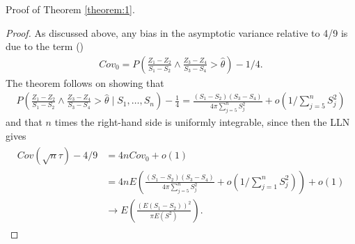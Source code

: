 \documentclass[12pt]{article}
\newcommand{\E}{E}
\renewcommand{\P}{P}
\newcommand{\cov}{Cov}
\newcommand{\z}{Z}
\newcommand{\s}{S}
\newcommand{\thetahat}{\hat{\theta}}
\begin{document}
\begin{appendices}
  \label{appendix:proof}

Proof of Theorem \ref{theorem:1}.

\begin{proof}
   As discussed above, any bias in the asymptotic variance relative to 4/9 is due to the term ()
    \begin{align}
      \cov_{0}=\P(\frac{\z_1-\z_2}{\s_1-\s_2}\wedge \frac{\z_3-\z_4}{\s_3-\s_4}>\thetahat) - 1/4.
      \label{thm1:cov_bias_source}
    \end{align}
    The theorem follows on showing that 
    \begin{align}
      \P\left(\frac{\z_1-\z_2}{\s_1-\s_2}\wedge \frac{\z_3-\z_4}{\s_3-\s_4}>\thetahat\mid \s_1,\ldots,\s_n\right)-\frac{1}{4}
      = \frac{(\s_1-\s_2)(\s_3-\s_4)}{4\pi\sum_{j=5}^n \s_j^2} + o(1/\sum_{j=5}^n \s_j^2)
    \end{align}
    and that $n$ times the right-hand side is uniformly integrable, since then the LLN gives
    \begin{align}
      \begin{split}
      \cov(\sqrt{n}\tau) - 4/9 &= 4n \cov_{0} + o(1)\\
                               &= 4n\E\left( \frac{(\s_1-\s_2)(\s_3-\s_4)}{4\pi\sum_{j=5}^n \s_j^2} + o(1/\sum_{j=1}^n \s_j^2) \right) + o(1)\\
                               &\to \E\left(\frac{(\E(\s_1-\s_2))^2}{\pi\E(\s^2)}\right).
                             \end{split}\label{thm1:conclusion}
    \end{align}
    

\end{proof}
\end{appendices}
\end{document}
